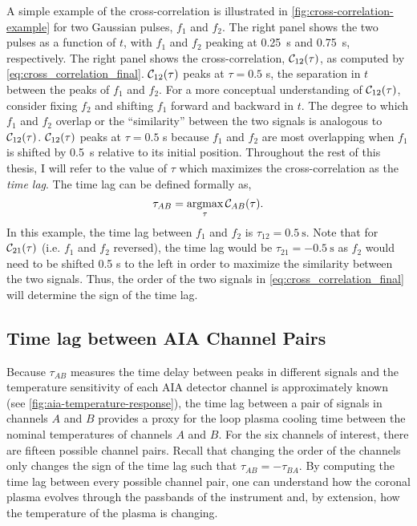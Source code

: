 A simple example of the cross-correlation is illustrated in \autoref{fig:cross-correlation-example} for two Gaussian pulses, $f_1$ and $f_2$. The right panel shows the two pulses as a function of $t$, with $f_1$ and $f_2$ peaking at \SI{0.25}{\second} and \SI{0.75}{\second}, respectively. The right panel shows the cross-correlation, $\crosscor[12]$, as computed by \autoref{eq:cross_correlation_final}. $\crosscor[12]$ peaks at $\tau=0.5$ \si{\second}, the separation in $t$ between the peaks of $f_1$ and $f_2$. For a more conceptual understanding of $\crosscor[12]$, consider fixing $f_2$ and shifting $f_1$ forward and backward in $t$. The degree to which $f_1$ and $f_2$ overlap or the ``similarity'' between the two signals is analogous to $\crosscor[12]$. $\crosscor[12]$ peaks at $\tau=0.5$ \si{\second} because $f_1$ and $f_2$ are most overlapping when $f_1$ is shifted by \SI{0.5}{\second} relative to its initial position. Throughout the rest of this thesis, I will refer to the value of $\tau$ which maximizes the cross-correlation as the \textit{time lag}. The time lag can be defined formally as,
\begin{equation}\label{eq:timelag}
    \tau_{AB} = \argmax_{\tau}\crosscor.
\end{equation}
In this example, the time lag between $f_1$ and $f_2$ is $\tau_{12}=\SI{0.5}{\second}$. Note that for $\crosscor[21]$ (i.e. $f_1$ and $f_2$ reversed), the time lag would be $\tau_{21}=\SI{-0.5}{\second}$ as $f_2$ would need to be shifted 0.5 s to the left in order to maximize the similarity between the two signals. Thus, the order of the two signals in \autoref{eq:cross_correlation_final} will determine the sign of the time lag.

\subsection{Time lag between AIA Channel Pairs}\label{subsec:timelag_aia}

Because $\tau_{AB}$ measures the time delay between peaks in different signals and the temperature sensitivity of each AIA detector channel is approximately known (see \autoref{fig:aia-temperature-response}), the time lag between a pair of signals in channels $A$ and $B$ provides a proxy for the loop plasma cooling time between the nominal temperatures of channels $A$ and $B$. For the six channels of interest, there are fifteen possible channel pairs. Recall that changing the order of the channels only changes the sign of the time lag such that $\tau_{AB}=-\tau_{BA}$. By computing the time lag between every possible channel pair, one can understand how the coronal plasma evolves through the passbands of the instrument and, by extension, how the temperature of the plasma is changing.

